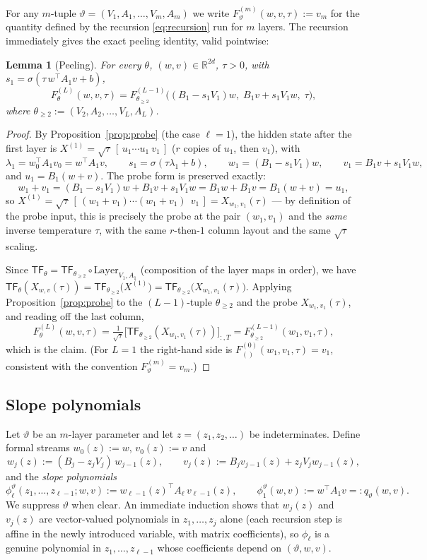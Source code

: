 \documentclass[11pt]{article}
\newtheorem{lemma}[theorem]{Lemma}
\theoremstyle{definition}
\theoremstyle{remark}
\theoremstyle{plain}
\newcommand{\R}{\mathbb{R}}
\newcommand{\sig}{\sigma}
\newcommand{\TF}{\mathsf{TF}}
\begin{document}
For any $m$-tuple $\vartheta=(V_1,A_1,\dots,V_m,A_m)$ we write
$F^{(m)}_\vartheta(w,v,\tau):=v_m$ for the quantity defined by the recursion
\eqref{eq:recursion} run for $m$ layers.  The recursion immediately gives the exact peeling
identity, valid pointwise:

\begin{lemma}[Peeling]\label{lem:peeling}
For every $\theta$, $(w,v)\in\R^{2d}$, $\tau>0$, with
$s_1=\sig(\tau\,w^\top A_1v+b)$,
\[
F^{(L)}_\theta(w,v,\tau)
=F^{(L-1)}_{\theta_{\ge2}}\big((B_1-s_1V_1)w,\;B_1v+s_1V_1w,\;\tau\big),
\]
where $\theta_{\ge2}:=(V_2,A_2,\dots,V_L,A_L)$.
\end{lemma}

\begin{proof}
By Proposition~\ref{prop:probe} (the case $\ell=1$), the hidden state after the first
layer is $X^{(1)}=\sqrt\tau\,[\,u_1\cdots u_1\ v_1\,]$ ($r$ copies of $u_1$, then $v_1$),
with
\[
\lambda_1=w_0^\top A_1v_0=w^\top A_1v,\qquad
s_1=\sig(\tau\lambda_1+b),\qquad
w_1=(B_1-s_1V_1)w,\qquad
v_1=B_1v+s_1V_1w,
\]
and $u_1=B_1(w+v)$.  The probe form is preserved exactly:
\[
w_1+v_1=(B_1-s_1V_1)w+B_1v+s_1V_1w=B_1w+B_1v=B_1(w+v)=u_1,
\]
so $X^{(1)}=\sqrt\tau\,[\,(w_1+v_1)\cdots(w_1+v_1)\ \ v_1\,]=X_{w_1,v_1}(\tau)$ --- by
definition of the probe input, this is precisely the probe at the pair $(w_1,v_1)$ and the
\emph{same} inverse temperature $\tau$, with the same $r$-then-$1$ column layout and the
same $\sqrt\tau$ scaling.

Since $\TF_\theta=\TF_{\theta_{\ge2}}\circ\mathrm{Layer}_{V_1,A_1}$ (composition of the
layer maps in order), we have
$\TF_\theta(X_{w,v}(\tau))=\TF_{\theta_{\ge2}}\big(X^{(1)}\big)
=\TF_{\theta_{\ge2}}\big(X_{w_1,v_1}(\tau)\big)$.
Applying Proposition~\ref{prop:probe} to the $(L-1)$-tuple $\theta_{\ge2}$ and the probe
$X_{w_1,v_1}(\tau)$, and reading off the last column,
\[
F^{(L)}_\theta(w,v,\tau)
=\tfrac1{\sqrt\tau}\big[\TF_{\theta_{\ge2}}(X_{w_1,v_1}(\tau))\big]_{:,T}
=F^{(L-1)}_{\theta_{\ge2}}(w_1,v_1,\tau),
\]
which is the claim.  (For $L=1$ the right-hand side is $F^{(0)}_{()}(w_1,v_1,\tau)=v_1$,
consistent with the convention $F^{(m)}_\vartheta=v_m$.)
\end{proof}

\subsection{Slope polynomials}\label{subsec:slope}
Let $\vartheta$ be an $m$-layer parameter and let $z=(z_1,z_2,\dots)$ be indeterminates.
Define formal streams $w_0(z):=w$, $v_0(z):=v$ and
\[
w_j(z):=(B_j-z_jV_j)\,w_{j-1}(z),\qquad
v_j(z):=B_jv_{j-1}(z)+z_jV_jw_{j-1}(z),
\]
and the \emph{slope polynomials}
\[
\phi^\vartheta_\ell(z_1,\dots,z_{\ell-1};w,v):=w_{\ell-1}(z)^\top A_\ell\,v_{\ell-1}(z),
\qquad \phi^\vartheta_1(w,v):=w^\top A_1v=:q_\vartheta(w,v).
\]
We suppress $\vartheta$ when clear.  An immediate induction shows that $w_j(z)$ and
$v_j(z)$ are vector-valued polynomials in $z_1,\dots,z_j$ alone (each recursion step is
affine in the newly introduced variable, with matrix coefficients), so $\phi_\ell$ is a
genuine polynomial in $z_1,\dots,z_{\ell-1}$ whose coefficients depend on
$(\vartheta,w,v)$.
\end{document}
